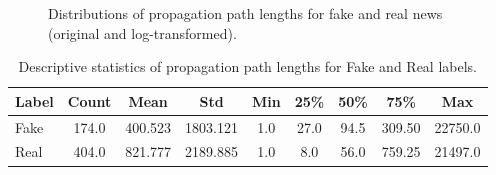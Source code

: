 \documentclass[a4paper,twoside,12pt]{book}
\begin{document}
\begin{figure}[h!]
	\centering
	
	
	\vspace{0.5cm} %
	
	
	\caption{Distributions of propagation path lengths for fake and real news (original and log-transformed).}
	\label{fig:combined_paths}
\end{figure}

\begin{table}[h!]
	\centering
	\begin{tabular}{lcccccccc}
		\toprule
		Label & Count & Mean & Std & Min & 25\% & 50\% & 75\% & Max \\
		\midrule
		Fake & 174.0 & 400.523 & 1803.121 & 1.0 & 27.0 & 94.5 & 309.50 & 22750.0 \\
		Real & 404.0 & 821.777 & 2189.885 & 1.0 & 8.0 & 56.0 & 759.25 & 21497.0 \\
		\bottomrule
	\end{tabular}
	\caption{Descriptive statistics of propagation path lengths for Fake and Real labels.}
	\label{tab:stats_prop_paths}
\end{table}
\end{document}

